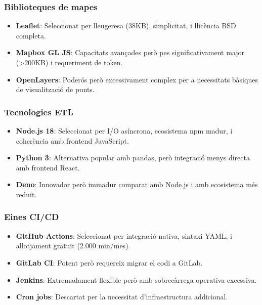 \subsubsection{Biblioteques de mapes}
\begin{itemize}
    \item \textbf{Leaflet}: Seleccionat per lleugeresa (38KB), simplicitat, i llicència BSD completa.
    \item \textbf{Mapbox GL JS}: Capacitats avançades però pes significativament major (>200KB) i requeriment de token.
    \item \textbf{OpenLayers}: Poderós però excessivament complex per a necessitats bàsiques de visualització de punts.
\end{itemize}

\subsubsection{Tecnologies ETL}
\begin{itemize}
    \item \textbf{Node.js 18}: Seleccionat per I/O asíncrona, ecosistema npm madur, i coherència amb frontend JavaScript.
    \item \textbf{Python 3}: Alternativa popular amb pandas, però integració menys directa amb frontend React.
    \item \textbf{Deno}: Innovador però immadur comparat amb Node.js i amb ecosistema més reduït.
\end{itemize}

\subsubsection{Eines CI/CD}
\begin{itemize}
    \item \textbf{GitHub Actions}: Seleccionat per integració nativa, sintaxi YAML, i allotjament gratuït (2.000 min/mes).
    \item \textbf{GitLab CI}: Potent però requereix migrar el codi a GitLab.
    \item \textbf{Jenkins}: Extremadament flexible però amb sobrecàrrega operativa excessiva.
    \item \textbf{Cron jobs}: Descartat per la necessitat d'infraestructura addicional.
\end{itemize}


